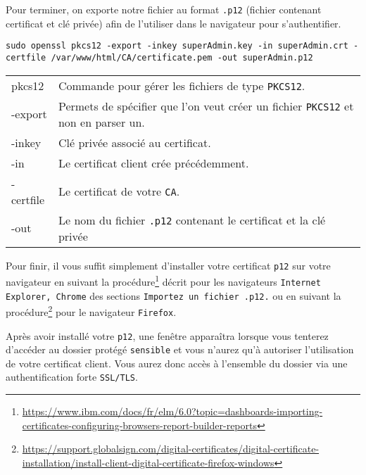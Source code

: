 Pour terminer, on exporte notre fichier au format \texttt{.p12} (fichier contenant certificat et clé privée) afin de l'utiliser dans le navigateur pour s'authentifier.

\begin{verbatim}
sudo openssl pkcs12 -export -inkey superAdmin.key -in superAdmin.crt -certfile /var/www/html/CA/certificate.pem -out superAdmin.p12
\end{verbatim}

\begin{tabular}{l|p{10cm}}
    pkcs12 & Commande pour gérer les fichiers de type \texttt{PKCS12}. \\
    -export & Permets de spécifier que l'on veut créer un fichier \texttt{PKCS12} et non en parser un.\\
    -inkey & Clé privée associé au certificat.\\
    -in & Le certificat client crée précédemment.\\
    -certfile & Le certificat de votre \texttt{CA}.\\
    -out & Le nom du fichier \texttt{.p12} contenant le certificat et la clé privée\\
\end{tabular}

Pour finir, il vous suffit simplement d'installer votre certificat \texttt{p12} sur votre navigateur en suivant la procédure\footnote{\url{https://www.ibm.com/docs/fr/elm/6.0?topic=dashboards-importing-certificates-configuring-browsers-report-builder-reports}} décrit pour les navigateurs \texttt{Internet Explorer, Chrome} des sections \texttt{Importez un fichier .p12.} ou en suivant la procédure\footnote{\url{https://support.globalsign.com/digital-certificates/digital-certificate-installation/install-client-digital-certificate-firefox-windows}} pour le navigateur \texttt{Firefox}.

Après avoir installé votre \texttt{p12}, une fenêtre apparaîtra lorsque vous tenterez d'accéder au dossier protégé  \texttt{sensible} et vous n'aurez qu'à autoriser l'utilisation de votre certificat client. Vous aurez donc accès à l'ensemble du dossier via une authentification forte \texttt{SSL/TLS}.


















